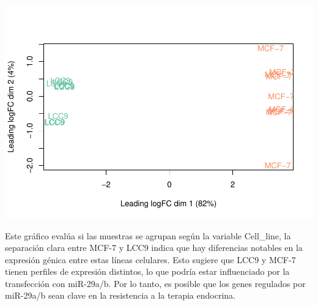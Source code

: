 \documentclass[
]{article}
\begin{document}
\includegraphics{Proyecto_RNAseq_files/figure-latex/unnamed-chunk-18-1.pdf}

Este gráfico evalúa si las muestras se agrupan según la variable
Cell\_line, la separación clara entre MCF-7 y LCC9 indica que hay
diferencias notables en la expresión génica entre estas líneas
celulares. Esto sugiere que LCC9 y MCF-7 tienen perfiles de expresión
distintos, lo que podría estar influenciado por la transfección con
miR-29a/b. Por lo tanto, es posible que los genes regulados por
miR-29a/b sean clave en la resistencia a la terapia endocrina.
\end{document}
